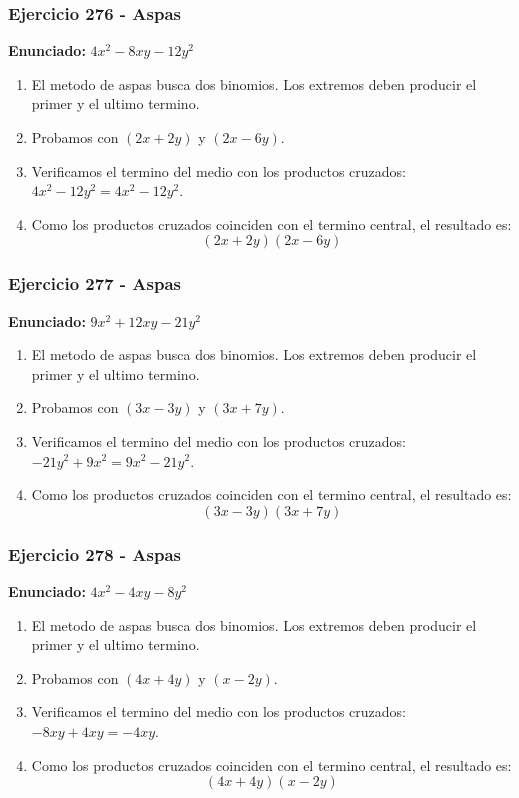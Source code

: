 \documentclass[11pt,a4paper]{article}
\begin{document}
\vspace{0.2cm}
\subsubsection*{Ejercicio 276 - Aspas}
\textbf{Enunciado:} $ 4 x^{2} - 8 x y - 12 y^{2} $\par
\begin{enumerate}[leftmargin=2em]
\item El metodo de aspas busca dos binomios. Los extremos deben producir el primer y el ultimo termino.
\item Probamos con \((2 x + 2 y)\) y \((2 x - 6 y)\).
\item Verificamos el termino del medio con los productos cruzados: \(4 x^{2}- 12 y^{2}=4 x^{2} - 12 y^{2}\).
\item Como los productos cruzados coinciden con el termino central, el resultado es: \[\boxed{\left(2 x + 2 y\right)\left(2 x - 6 y\right)}\]
\end{enumerate}

\vspace{0.2cm}
\subsubsection*{Ejercicio 277 - Aspas}
\textbf{Enunciado:} $ 9 x^{2} + 12 x y - 21 y^{2} $\par
\begin{enumerate}[leftmargin=2em]
\item El metodo de aspas busca dos binomios. Los extremos deben producir el primer y el ultimo termino.
\item Probamos con \((3 x - 3 y)\) y \((3 x + 7 y)\).
\item Verificamos el termino del medio con los productos cruzados: \(- 21 y^{2}+9 x^{2}=9 x^{2} - 21 y^{2}\).
\item Como los productos cruzados coinciden con el termino central, el resultado es: \[\boxed{\left(3 x - 3 y\right)\left(3 x + 7 y\right)}\]
\end{enumerate}

\vspace{0.2cm}
\subsubsection*{Ejercicio 278 - Aspas}
\textbf{Enunciado:} $ 4 x^{2} - 4 x y - 8 y^{2} $\par
\begin{enumerate}[leftmargin=2em]
\item El metodo de aspas busca dos binomios. Los extremos deben producir el primer y el ultimo termino.
\item Probamos con \((4 x + 4 y)\) y \((x - 2 y)\).
\item Verificamos el termino del medio con los productos cruzados: \(- 8 x y+4 x y=- 4 x y\).
\item Como los productos cruzados coinciden con el termino central, el resultado es: \[\boxed{\left(4 x + 4 y\right)\left(x - 2 y\right)}\]
\end{enumerate}
\end{document}

